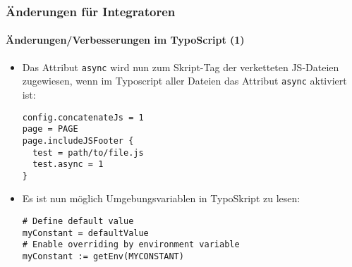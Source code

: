 
\begin{frame}[fragile]
	\frametitle{Änderungen für Integratoren}
	\framesubtitle{Änderungen/Verbesserungen im TypoScript (1)}

	\lstset{basicstyle=\smaller\ttfamily}

	\begin{itemize}
		\item Das Attribut \texttt{async} wird nun zum Skript-Tag der verketteten JS-Dateien
			zugewiesen, wenn im Typoscript aller Dateien das Attribut \texttt{async}
			aktiviert ist:

			\begin{lstlisting}
config.concatenateJs = 1
page = PAGE
page.includeJSFooter {
  test = path/to/file.js
  test.async = 1
}
			\end{lstlisting}

		\item Es ist nun möglich Umgebungsvariablen in TypoSkript zu lesen:

			\begin{lstlisting}
# Define default value
myConstant = defaultValue
# Enable overriding by environment variable
myConstant := getEnv(MYCONSTANT)
			\end{lstlisting}

	\end{itemize}

\end{frame}


